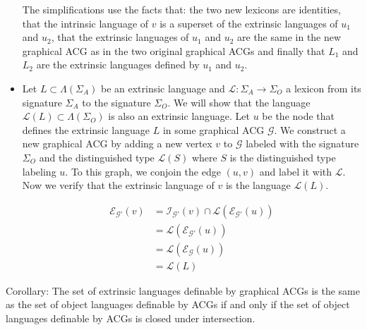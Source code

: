 \begin{itemize}
  The simplifications use the facts that: the two new lexicons are
  identities, that the intrinsic language of $v$ is a superset of the
  extrinsic languages of $u_1$ and $u_2$, that the extrinsic languages
  of $u_1$ and $u_2$ are the same in the new graphical ACG as in the two
  original graphical ACGs and finally that $L_1$ and $L_2$ are the
  extrinsic languages defined by $u_1$ and $u_2$.

\item Let $L \subset \Lambda(\Sigma_A)$ be an extrinsic language and
  $\mathcal{L} : \Sigma_A \to \Sigma_O$ a lexicon from its signature
  $\Sigma_A$ to the signature $\Sigma_O$. We will show that the language
  $\mathcal{L}(L) \subset \Lambda(\Sigma_O)$ is also an extrinsic
  language. Let $u$ be the node that defines the extrinsic language $L$
  in some graphical ACG $\mathcal{G}$. We construct a new graphical ACG
  by adding a new vertex $v$ to $\mathcal{G}$ labeled with the signature
  $\Sigma_O$ and the distinguished type $\mathcal{L}(S)$ where $S$ is
  the distinguished type labeling $u$. To this graph, we conjoin the
  edge $(u,v)$ and label it with $\mathcal{L}$. Now we verify that the
  extrinsic language of $v$ is the language $\mathcal{L}(L).$

  \begin{align*}
    \mathcal{E}_{\mathcal{G}'}(v) &= \mathcal{I}_{\mathcal{G}'}(v) \cap
    \mathcal{L}(\mathcal{E}_{\mathcal{G}'}(u)) \\
    &= \mathcal{L}(\mathcal{E}_{\mathcal{G}'}(u)) \\
    &= \mathcal{L}(\mathcal{E}_{\mathcal{G}}(u)) \\
    &= \mathcal{L}(L)
  \end{align*}


\end{itemize}



Corollary: The set of extrinsic languages definable by graphical ACGs is
the same as the set of object languages definable by ACGs if and only if
the set of object languages definable by ACGs is closed under
intersection.
